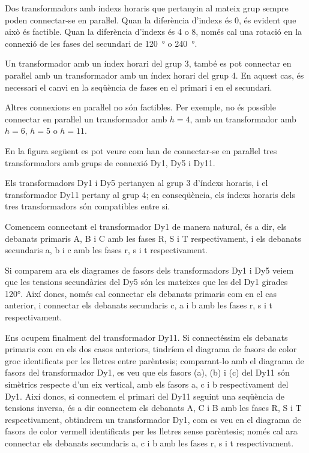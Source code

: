 Dos transformadors amb indexs horaris que pertanyin al mateix grup sempre poden connectar-se en paraŀlel. Quan la diferència d'indexs és 0, és evident que això és factible. Quan la diferència d'indexs és 4 o 8, només cal una rotació en la connexió de les fases del secundari de \qty{120}{\degree} o \qty{240}{\degree}.

Un transformador amb un índex horari del grup 3, també es pot connectar en paraŀlel amb un transformador amb un índex horari del grup 4. En aquest cas, és necessari el canvi en la seqüència de fases en el primari i en el secundari.

Altres connexions en paraŀlel no són factibles.
Per exemple, no és possible connectar en paraŀlel un transformador amb $h=4$, amb un transformador amb $h=6$, $h=5$ o $h=11$.

	
\begin{exemple}[\ConnexParalDifIndex{}]
	\addcontentsxms{\ConnexParalDifIndex}
    En la figura següent es pot veure com han de connectar-se en paraŀlel tres transformadors amb grups de connexió Dy1, Dy5 i Dy11.

	 \begin{center}
		
	\end{center}

      Els transformadors Dy1 i Dy5 pertanyen al grup 3 d'índexs horaris, i el  transformador  Dy11 pertany al grup 4; en conseqüència, els índexs horaris dels tres transformadors són compatibles entre si.


    Comencem connectant el  transformador Dy1 de manera natural, és a dir, els debanats primaris A, B i C amb les fases R, S i T respectivament, i els debanats secundaris a, b i c amb les fases r, s i t respectivament.

  

    Si comparem ara els diagrames de fasors dels transformadors Dy1 i Dy5 veiem que les tensions secundàries del Dy5 són les mateixes que les del Dy1 girades \ang{120}. Així doncs, només  cal connectar els debanats primaris com en el cas anterior, i connectar els debanats secundaris c, a i b amb les fases r, s i t respectivament.


    Ens ocupem finalment del transformador Dy11. Si connectéssim els debanats primaris com en els dos casos anteriors, tindríem el diagrama de fasors de color groc identificats  per les lletres entre parèntesis; comparant-lo amb el diagrama de fasors del transformador Dy1, es veu que els fasors (a), (b) i (c) del Dy11 són simètrics respecte d'un eix vertical, amb els fasors a, c i b respectivament del Dy1. Així doncs, si connectem el primari del Dy11 seguint una seqüència de tensions inversa, és a dir connectem els debanats A, C i B amb les fases R, S i T respectivament, obtindrem un transformador Dy1, com es veu en el diagrama de fasors de color vermell identificats per les lletres sense parèntesis; només cal ara connectar els debanats secundaris a, c i b amb les fases r, s i t respectivament.
\end{exemple}

